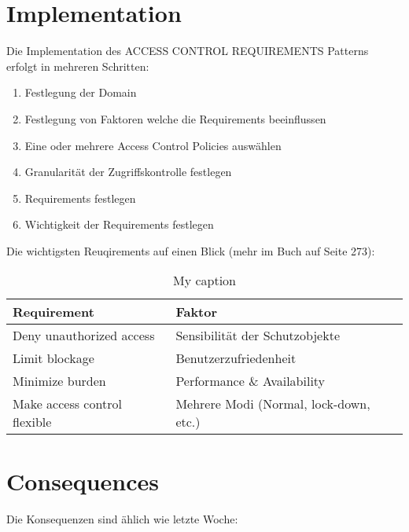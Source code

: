 \section{Implementation}
Die Implementation des ACCESS CONTROL REQUIREMENTS Patterns erfolgt in mehreren Schritten:

\begin{enumerate}
  \item Festlegung der Domain
  \item Festlegung von Faktoren welche die Requirements beeinflussen
  \item Eine oder mehrere Access Control Policies auswählen
  \item Granularität der Zugriffskontrolle festlegen
  \item Requirements festlegen
  \item Wichtigkeit der Requirements festlegen
\end{enumerate}

Die wichtigsten Reuqirements auf einen Blick (mehr im Buch auf Seite 273):
\begin{table}[H]
  \centering
  \caption{My caption}
  \label{my-label}
  \begin{tabular}{@{}ll@{}}
    \toprule
    {\bf Requirement}            & {\bf Faktor}                           \\ \midrule
    Deny unauthorized access     & Sensibilität der Schutzobjekte         \\
    Limit blockage               & Benutzerzufriedenheit                  \\
    Minimize burden              & Performance \& Availability            \\
    Make access control flexible & Mehrere Modi (Normal, lock-down, etc.) \\ \bottomrule
  \end{tabular}
\end{table}

\section{Consequences}
Die Konsequenzen sind ählich wie letzte Woche:

\begin{itemize}
\end{itemize}

